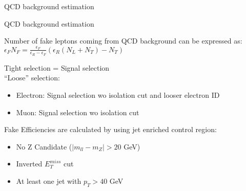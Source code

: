 \documentclass[8pt]{beamer}
\begin{document}
\egroup
 { %
    \begin{frame}{QCD background estimation}
     \end{frame}
}
 \begin{frame}{QCD background estimation}
 
      
  Number of fake leptons coming from QCD background can be expressed as: \\
  \vspace{0.2cm}
  \hspace{0.6cm}
  $\epsilon_F N_F=\frac{\epsilon_{F}}{\epsilon_{R}-\epsilon_{F}}\left(\epsilon_{R}(N_{L}+N_{T})-N_{T}\right)$

  
  \vspace{0.5cm}
  Tight selection = Signal selection \\
  ``Loose'' selection:
  \begin{itemize}
   \item Electron: Signal selection wo isolation cut and looser electron ID
   \item Muon: Signal selection wo isolation cut
  \end{itemize}
  
  \vspace{0.5cm}
  Fake Efficiencies are calculated by using jet enriched control region:
  \begin{itemize}
   \item No Z Candidate ($|m_{ll}-m_{Z}| > 20$ GeV)
   \item Inverted $E_{T}^{miss}$ cut
   \item At least one jet with $p_{T} > 40$ GeV
  \end{itemize}


 \end{frame}
\backupend
\end{document}
